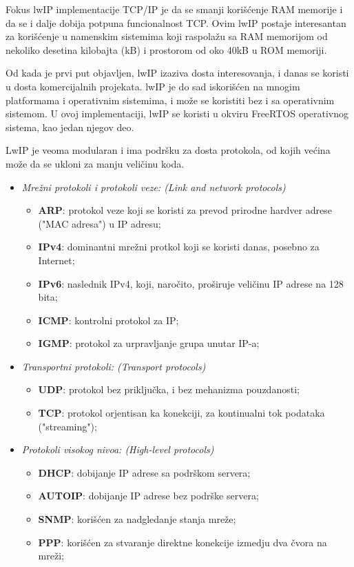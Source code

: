 \documentclass[a4paper,12pt, master]{etf}
\begin{document}
	Fokus lwIP implementacije TCP/IP je da se smanji kori\v{s}\'{c}enje RAM 
	memorije i da se i dalje dobija potpuna funcionalnost TCP\@. Ovim lwIP 
	postaje interesantan za kori\v{s}\'{c}enje u namenskim sistemima koji 
	raspola\v{z}u sa RAM memorijom od nekoliko desetina kilobajta (kB) i 
	prostorom od oko 40kB u ROM memoriji.

	Od kada je prvi put objavljen, lwIP izaziva dosta interesovanja, i danas se 
	koristi u dosta	komercijalnih projekata\@. lwIP je do sad 
	iskori\v{s}\'{c}en na mnogim platformama i operativnim sistemima, i 
	mo\v{z}e se koristiti bez i sa operativnim sistemom. U ovoj implementaciji, 
	lwIP se koristi u okviru FreeRTOS operativnog sistema, kao jedan njegov deo.

	LwIP je veoma modularan i ima podr\v{s}ku za dosta protokola, od kojih 
	ve\'{c}ina mo\v{z}e da se ukloni za manju veli\v{c}inu koda.
	
	\begin{itemize}
		\item \textit{Mre\v{z}ni protokoli i protokoli veze: (Link and network 
		protocols)}
		\begin{itemize}
			\item \textbf{ARP}: protokol veze koji se koristi za prevod 
			prirodne hardver adrese ("MAC adresa") u IP adresu;
			\item \textbf{IPv4}: dominantni mre\v{z}ni protkol koji se koristi 
			danas, posebno za Internet;
			\item \textbf{IPv6}: naslednik IPv4, koji, naro\v{c}ito, 
			pro\v{s}iruje veli\v{c}inu IP adrese na 128 bita;
			\item \textbf{ICMP}: kontrolni protokol za IP;
			\item \textbf{IGMP}: protokol za urpravljanje grupa unutar IP-a;
		\end{itemize}
		\item \textit{Transportni protokoli: (Transport protocols)}
			\begin{itemize}
				\item \textbf{UDP}: protokol bez priklju\v{c}ka, i bez 
				mehanizma pouzdanosti;
				\item \textbf{TCP}: protokol orjentisan ka konekciji, za 
				kontinualni tok	podataka ("streaming");
			\end{itemize}
		\item \textit{Protokoli visokog nivoa: (High-level protocols)}
			\begin{itemize}
				\item \textbf{DHCP}: dobijanje IP adrese sa podr\v{s}kom 
				servera;
				\item \textbf{AUTOIP}: dobijanje IP adrese bez podr\v{s}ke 
				servera;
				\item \textbf{SNMP}: kori\v{s}\'{c}en za nadgledanje stanja 
				mre\v{z}e;
				\item \textbf{PPP}: kori\v{s}\'{c}en za stvaranje direktne 
				konekcije izmedju dva \v{c}vora	na mre\v{z}i;
			\end{itemize}
	\end{itemize}
\end{document}
